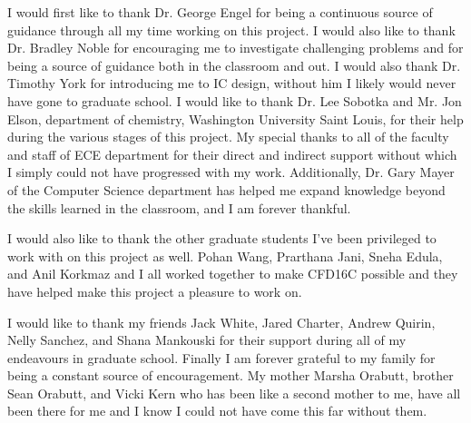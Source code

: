 \documentclass[12pt,oneside,final]{siuethesis}
\theoremstyle{definition}
\begin{document}
\begin{acknowledgements} 

\par I would first like to thank Dr. George Engel for being a continuous source of guidance through all my time working on this project. I would also like to thank Dr. Bradley Noble for encouraging me to investigate challenging problems and for being a source of guidance both in the classroom and out. I would also thank Dr. Timothy York for introducing me to IC design, without him I likely would never have gone to graduate school. I  would  like  to thank  Dr.  Lee  Sobotka  and  Mr.  Jon  Elson,  department  of  chemistry, Washington  University  Saint  Louis,  for  their  help  during  the  various  stages  of  this  project. My  special  thanks  to all of the  faculty  and  staff  of  ECE  department  for  their  direct  and  indirect support without which I simply could not have progressed with my work. Additionally, Dr. Gary Mayer of the Computer Science department has helped me expand knowledge beyond the skills learned in the classroom, and I am forever thankful. 
\par I would also like to thank the other graduate students I've been privileged to work with on this project as well. Pohan Wang, Prarthana Jani, Sneha Edula, and Anil Korkmaz and I all worked together to make CFD16C possible and they have helped make this project a pleasure to work on.
\par I would like to thank my friends Jack White, Jared Charter, Andrew Quirin, Nelly Sanchez, and Shana Mankouski for their support during all of my endeavours in graduate school. Finally I am forever grateful to my family for being a constant source of encouragement. My mother Marsha Orabutt, brother Sean Orabutt, and Vicki Kern who has been like a second mother to me, have all been there for me and I know I could not have come this far without them.

\end{acknowledgements}

\tableofcontents

\cleardoublepage %

\cleardoublepage

\listoffigures %

\cleardoublepage

\listoftables

\mainmatter %
\end{document}
